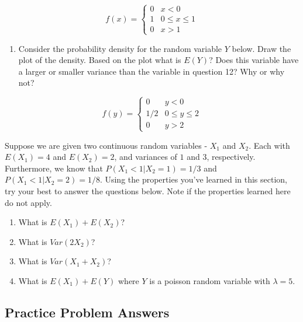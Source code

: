 \documentclass[
]{book}
\providecommand{\tightlist}{%
  \setlength{\itemsep}{0pt}\setlength{\parskip}{0pt}}
\theoremstyle{definition}
\theoremstyle{definition}
\theoremstyle{definition}
\theoremstyle{definition}
\theoremstyle{remark}
\begin{document}
\[
f(x) = \begin{cases}
0 & x < 0 \\
1 & 0 \leq x \leq 1 \\
0 & x > 1
\end{cases}
\]

\begin{enumerate}
\def\labelenumi{\arabic{enumi}.}
\setcounter{enumi}{13}
\tightlist
\item
  Consider the probability density for the random variable \(Y\) below. Draw the plot of the density. Based on the plot what is \(E(Y)\)? Does this variable have a larger or smaller variance than the variable in question 12? Why or why not?
\end{enumerate}

\[
f(y) = \begin{cases}
0 & y < 0 \\
1/2 & 0 \leq y \leq 2 \\
0 & y > 2
\end{cases}
\]

Suppose we are given two continuous random variables - \(X_1\) and \(X_2\). Each with \(E(X_1) = 4\) and \(E(X_2) = 2\), and variances of \(1\) and \(3\), respectively. Furthermore, we know that \(P(X_1 < 1| X_2 = 1) = 1/3\) and \(P(X_1< 1 | X_2 = 2) = 1/8\). Using the properties you've learned in this section, try your best to answer the questions below. Note if the properties learned here do not apply.

\begin{enumerate}
\def\labelenumi{\arabic{enumi}.}
\setcounter{enumi}{14}
\item
  What is \(E(X_1) + E(X_2)\)?
\item
  What is \(Var(2X_2)\)?
\item
  What is \(Var(X_1 + X_2)\)?
\item
  What is \(E(X_1) + E(Y)\) where \(Y\) is a poisson random variable with \(\lambda = 5\).
\end{enumerate}

\subsection{Practice Problem Answers}\label{practice-problem-answers-2}
\end{document}
